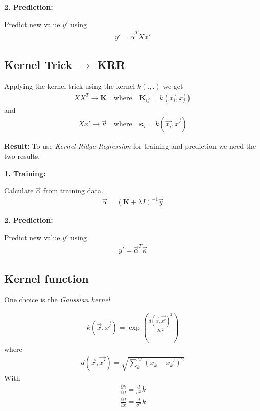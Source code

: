 \documentclass[english,a4paper,oneside, twocolumn,article,9pt]{memoir}
\newcommand{\mb}[1]{\mathbf{#1}}
\begin{document}
\textbf{2. Prediction:}

Predict new value $y'$ using
\begin{align*}
y' = \vec{\alpha}^T Xx'
\end{align*}

\subsection{Kernel Trick $\rightarrow$ KRR}
Applying the kernel trick using the kernel $k(.,.)$ we get
\begin{align*}
XX^T \rightarrow \mb{K} \quad \text{where} \quad \mb{K}_{ij} = k(\vec{x_i},\vec{x_j})
\end{align*}
and
\begin{align*}
Xx' \rightarrow \vec{\kappa} \quad \text{where} \quad \mb{\kappa}_{i} = k(\vec{x_i},\vec{x'})
\end{align*}

\textbf{Result:} To use \textit{Kernel Ridge Regression} for training and prediction we need the two results.

\bigskip

\textbf{1. Training:}

Calculate $\vec{\alpha}$ from training data.
\begin{align}
\vec{\alpha} = (\mb{K} + \lambda I)^{-1}\vec{y}
\end{align} 

\textbf{2. Prediction:}

Predict new value $y'$ using
\begin{align}
y' = \vec{\alpha}^T \vec{\kappa}
\end{align}

\subsection{Kernel function}

One choice is the \textit{Gaussian kernel}

\begin{align}
k(\vec{x}, \vec{x'}) = \exp\left(\frac{d(\vec{x}, \vec{x'})^2}{2\sigma^2}\right)
\end{align}
where
\begin{align}
d(\vec{x}, \vec{x'}) = \sqrt{\sum_{k}^{M}(x_k - x_k')^2}
\end{align}
With
\begin{align*}
\frac{\partial k}{\partial d} = \frac{d}{\sigma^2}k
\end{align*}
\begin{align*}
\frac{\partial d}{\partial x} = \frac{d}{\sigma^2}k
\end{align*}
\end{document}
